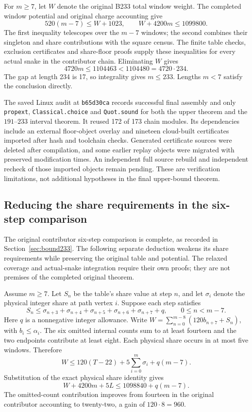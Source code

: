 \documentclass[11pt,a4paper]{article}
\theoremstyle{definition}
\theoremstyle{remark}
\begin{document}
For $m\ge7$, let $W$ denote the original B233 total window weight.
The completed window potential and original charge accounting give
\[
520(m-7)\le W+1023,\qquad W+4200m\le1099800.
\]
The first inequality telescopes over the $m-7$ windows; the second
combines their singleton and share contributions with the square census.
The finite table checks, exclusion certificates and share-floor proofs
supply these inequalities for every actual snake in the contributor chain.
Eliminating $W$ gives
\[
4720m\le1104463<1104480=4720\cdot234.
\]
The gap at length 234 is 17, so integrality gives $m\le233$.
Lengths $m<7$ satisfy the conclusion directly.

The saved Linux audit at \texttt{b65d30ca} records successful final
assembly and only \texttt{propext}, \texttt{Classical.choice} and
\texttt{Quot.sound} for both the upper theorem and the $191$--$233$
interval theorem. It reused 172 of 173 chain modules. Its dependencies
include an external floor-object overlay and nineteen cloud-built
certificates imported after hash and toolchain checks. Generated
certificate sources were deleted after compilation, and some earlier
replay objects were migrated with preserved modification times.
An independent full source rebuild and independent recheck of those
imported objects remain pending. These are verification limitations,
not additional hypotheses in the final upper-bound theorem.

\subsection{Reducing the share requirements in the six-step comparison}\label{sec:slack233}
The original contributor six-step comparison is complete, as recorded
in Section~\ref{sec:bound233}. The following separate deduction weakens
its share requirements while preserving the original table and potential.
The relaxed coverage and actual-snake integration require their own proofs;
they are not premises of the completed original theorem.

Assume $m\ge7$. Let $S_n$ be the table's share value at step $n$,
and let $\sigma_i$ denote the physical integer share at path vertex $i$.
Suppose each step satisfies
\[
S_n\le\sigma_{n+3}+\sigma_{n+4}+\sigma_{n+5}
       +\sigma_{n+6}+\sigma_{n+7}+q,
\qquad 0\le n<m-7.
\]
Here $q$ is a nonnegative integer allowance. Write
$W=\sum_{n=0}^{m-8}(120b_{n+7}+S_n)$, with $b_i\le\alpha_i$.
The six omitted internal counts sum to at least fourteen and the two
endpoints contribute at least eight. Each physical share occurs in at
most five windows. Therefore
\[
W\le120(T-22)+5\sum_{i=0}^{m}\sigma_i+q(m-7).
\]
Substitution of the exact physical share identity gives
\begin{equation}\label{eq:slack-budget233}
W+4200m+5L\le1098840+q(m-7).
\end{equation}
The omitted-count contribution improves from fourteen in the original
contributor accounting to twenty-two, a gain of $120\cdot8=960$.
\end{document}
